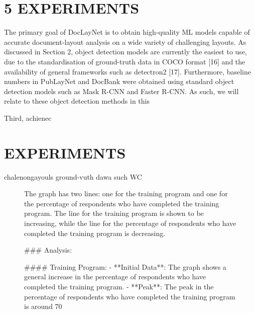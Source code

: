 \documentclass[11pt,a4paper]{article}
\begin{document}
\section{5 EXPERIMENTS}

The primary goal of DocLayNet is to obtain high-quality ML models capable of accurate document-layout analysis on a wide variety of challenging layouts. As discussed in Section 2, object detection models are currently the easiest to use, due to the standardisation of ground-truth data in COCO format [16] and the availability of general frameworks such as detectron2 [17]. Furthermore, baseline numbers in PubLayNet and DocBank were obtained using standard object detection models such as Mask R-CNN and Faster R-CNN. As such, we will relate to these object detection methods in this

\begin{figure}[h]
\end{figure}

Third, achienec

\section{EXPERIMENTS}

chalenongayouls ground-vuth dawa such WC

\begin{figure}[h]

The graph has two lines: one for the training program and one for the percentage of respondents who have completed the training program. The line for the training program is shown to be increasing, while the line for the percentage of respondents who have completed the training program is decreasing.

### Analysis:

#### Training Program:
- **Initial Data**: The graph shows a general increase in the percentage of respondents who have completed the training program.
- **Peak**: The peak in the percentage of respondents who have completed the training program is around 70%
\end{figure}
\end{document}
